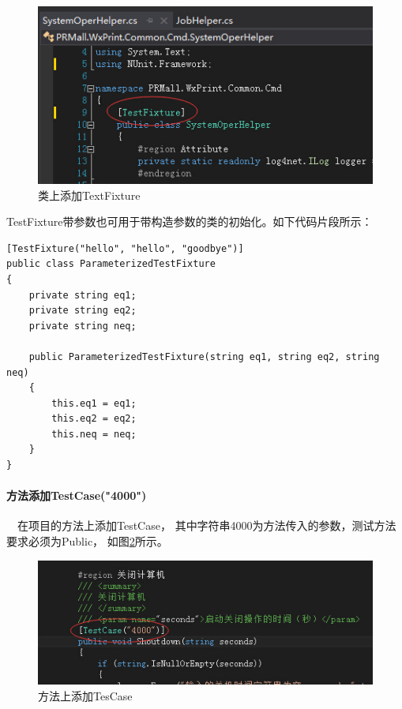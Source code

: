 \documentclass{book}
\begin{document}
\begin{figure}[htbp]
	\centering
	\includegraphics[scale=1]{AddTextFixtureToClass.jpg}
	\caption{类上添加TextFixture}
	\label{AddTextFixtureToClass}
\end{figure}

TestFixture带参数也可用于带构造参数的类的初始化。如下代码片段所示：

\begin{lstlisting}[language={[Sharp]C}]
[TestFixture("hello", "hello", "goodbye")]
public class ParameterizedTestFixture
{
    private string eq1;
    private string eq2;
    private string neq;
    
    public ParameterizedTestFixture(string eq1, string eq2, string neq)
    {
        this.eq1 = eq1;
        this.eq2 = eq2;
        this.neq = neq;
    }
}
\end{lstlisting}

\paragraph{方法添加TestCase("4000")}~~在项目的方法上添加TestCase，
其中字符串4000为方法传入的参数，测试方法要求必须为Public，
如图\ref{AddTesCaseToFunction}所示。

\begin{figure}[htbp]
	\centering
	\includegraphics[scale=1]{AddTesCaseToFunction.jpg}
	\caption{方法上添加TesCase}
	\label{AddTesCaseToFunction}
\end{figure}
\end{document}
